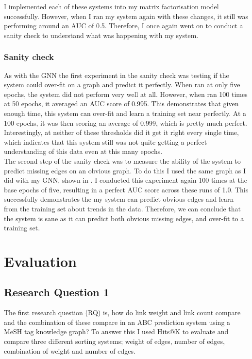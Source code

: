 \documentclass{l4proj}
\begin{document}
I implemented each of these systems into my matrix factorisation model successfully. However, when I ran my system again with these changes, it still was performing around an AUC of 0.5. Therefore, I once again went on to conduct a sanity check to understand what was happening with my system. \\

\subsection{Sanity check}

As with the GNN the first experiment in the sanity check was testing if the system could over-fit on a graph and predict it perfectly. When ran at only five epochs, the system did not perform very well at all. However, when ran 100 times at 50 epochs, it averaged an AUC score of 0.995. This demonstrates that given enough time, this system can over-fit and learn a training set near perfectly. At a 100 epochs, it was then scoring an average of 0.999, which is pretty much perfect. Interestingly, at neither of these thresholds did it get it right every single time, which indicates that this system still was not quite getting a perfect understanding of this data even at this many epochs. \\

The second step of the sanity check was to measure the ability of the system to predict missing edges on an obvious graph. To do this I used the same graph as I did with my GNN, shown in . I conducted this experiment again 100 times at the base epochs of five, resulting in a perfect AUC score across these runs of 1.0. This successfully demonstrates the my system can predict obvious edges and learn from the training set about trends in the data. Therefore, we can conclude that the system is sane as it can predict both obvious missing edges, and over-fit to a training set. \\

\chapter{Evaluation} 

\section{Research Question 1}

The first research question (RQ) is, how do link weight and link count compare and the combination of these compare in an ABC prediction system using a MeSH tag knowledge graph? To answer this I used Hits@K to evaluate and compare three different sorting systems; weight of edges, number of edges, combination of weight and number of edges. \\
\end{document}
